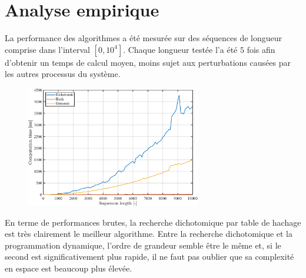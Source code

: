 \documentclass[a4paper, 12pt]{article}
\begin{document}
	\section{Analyse empirique}
	La performance des algorithmes a été mesurée sur des séquences de longueur comprise dans l'interval $[0, 10^4]$. Chaque longueur testée l'a été $5$ fois afin d'obtenir un temps de calcul moyen, moins sujet aux perturbations causées par les autres processus du système.
	\begin{figure}[H]
		\centering
		\includegraphics[width=0.68\textwidth]{resources/pdf/all.pdf}
		\label{fig:all}
	\end{figure}
	En terme de performances brutes, la recherche dichotomique par table de hachage est très clairement le meilleur algorithme. Entre la recherche dichotomique et la programmation dynamique, l'ordre de grandeur semble être le même et, si le second est significativement plus rapide, il ne faut pas oublier que sa complexité en espace est beaucoup plus élevée.
	\newpage
\end{document}
